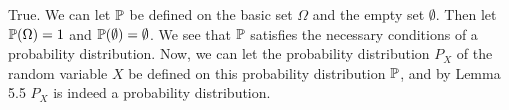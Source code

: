 
True. We can let $ \P$ be defined on the basic set $ \Omega$ and the empty set $ \emptyset$. Then
let $ \P(\Omega) = 1$ and $ \P(\emptyset) = \emptyset$. We see that $ \P$ satisfies the necessary
conditions of a probability distribution. Now, we can let the probability distribution $ P_{X} $
of the random variable $ X$ be defined on this probability distribution $ \P$, and by Lemma 5.5
$ P_{X} $ is indeed a probability distribution.

